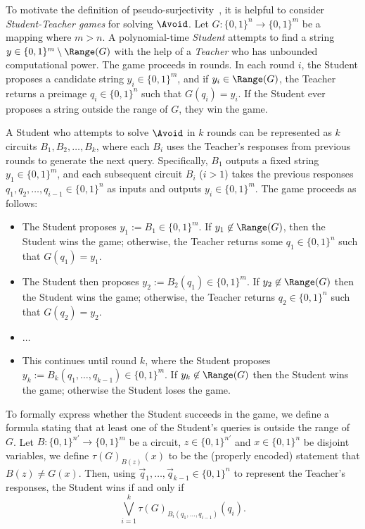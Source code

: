 To motivate the definition of pseudo-surjectivity~\cite[Definition 3.1]{Krajicek04}, it is helpful to consider \emph{Student-Teacher games} for solving $\Avoid$. Let $G: \{0, 1\}^n \to \{0, 1\}^m$ be a mapping where $m > n$. A polynomial-time \emph{Student} attempts to find a string $y \in \{0, 1\}^m \setminus \Range(G)$ with the help of a \emph{Teacher} who has unbounded computational power. The game proceeds in rounds. In each round $i$, the Student proposes a candidate string $y_i \in \{0, 1\}^m$, and if $y_i \in \Range(G)$, the Teacher returns a preimage $q_i \in \{0, 1\}^n$ such that $G(q_i) = y_i$. If the Student ever proposes a string outside the range of $G$, they win the game.

A Student who attempts to solve $\Avoid$ in $k$ rounds can be represented as $k$ circuits $B_1, B_2, \dots, B_k$, where each $B_i$ uses the Teacher's responses from previous rounds to generate the next query. Specifically, $B_1$ outputs a fixed string $y_1 \in \{0, 1\}^m$, and each subsequent circuit $B_i$ ($i > 1$) takes the previous responses $q_1, q_2, \dots, q_{i-1} \in \{0, 1\}^n$ as inputs and outputs $y_i \in \{0, 1\}^m$. The game proceeds as follows:

\begin{itemize}
    \item The Student proposes $y_1 := B_1\in \{0, 1\}^m$. If $y_1 \not\in\Range(G)$, then the Student wins the game; otherwise, the Teacher returns some $q_1 \in \{0, 1\}^n$ such that $G(q_1) = y_1$.
    \item The Student then proposes $y_2 := B_2(q_1) \in \{0, 1\}^m$. If $y_2 \not \in \Range(G)$ then the Student wins the game; otherwise, the Teacher returns $q_2 \in \{0, 1\}^n$ such that $G(q_2) = y_2$.
    \item $\dots$
    \item This continues until round $k$, where the Student proposes $y_k := B_k(q_1, \dots, q_{k-1}) \in \{0, 1\}^m$. If $y_k \not\in \Range(G)$ then the Student wins the game; otherwise the Student loses the game.
\end{itemize}

To formally express whether the Student succeeds in the game, we define a formula stating that at least one of the Student's queries is outside the range of $G$. Let $B: \{0, 1\}^{n'} \to \{0, 1\}^m$ be a circuit, $z \in \{0, 1\}^{n'}$ and $x \in \{0, 1\}^n$ be disjoint variables, we define $\tau(G)_{B(z)}(x)$ to be the (properly encoded) statement that $B(z) \ne G(x)$. Then, using $\vec{q}_1, \dots, \vec{q}_{k-1} \in \{0, 1\}^n$ to represent the Teacher's responses, the Student wins if and only if
\begin{equation}
   \label{eq: the student wins the game} \bigvee_{i=1}^k\tau(G)_{B_i(q_1, \dots, q_{i-1})}(q_i).
\end{equation}


